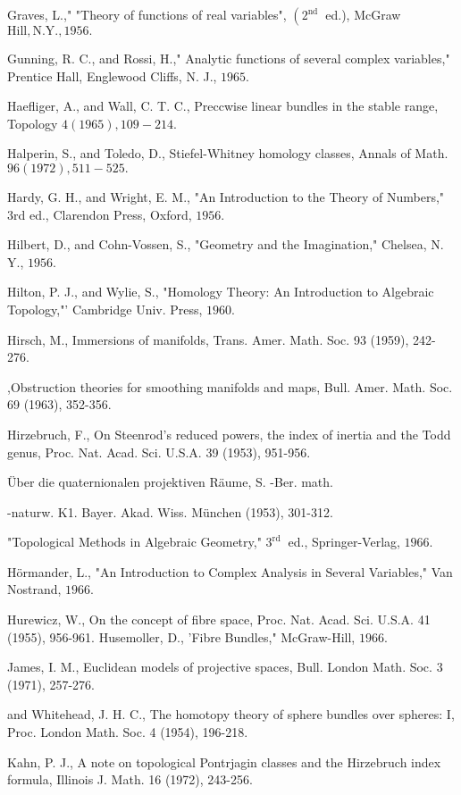\documentclass[10pt]{article}
\begin{document}
Graves, L.," "Theory of functions of real variables", $\left(2^{\text {nd }}\right.$ ed.), McGraw$\mathrm{Hill}, \mathrm{N} . \mathrm{Y} ., 1956 .$

Gunning, R. C., and Rossi, H.," Analytic functions of several complex variables," Prentice Hall, Englewood Cliffs, N. J., $1965 .$

Haefliger, A., and Wall, C. T. C., Preccwise linear bundles in the stable range, Topology $4(1965), 109-214 .$

Halperin, S., and Toledo, D., Stiefel-Whitney homology classes, Annals of Math. $96(1972), 511-525 .$

Hardy, G. H., and Wright, E. M., "An Introduction to the Theory of Numbers," 3rd ed., Clarendon Press, Oxford, $1956 .$

Hilbert, D., and Cohn-Vossen, S., "Geometry and the Imagination," Chelsea, N. Y., $1956 .$

Hilton, P. J., and Wylie, S., "Homology Theory: An Introduction to Algebraic Topology,"' Cambridge Univ. Press, $1960 .$

Hirsch, M., Immersions of manifolds, Trans. Amer. Math. Soc. 93 (1959), 242-276.

,Obstruction theories for smoothing manifolds and maps, Bull. Amer. Math. Soc. 69 (1963), 352-356.

Hirzebruch, F., On Steenrod's reduced powers, the index of inertia and the Todd genus, Proc. Nat. Acad. Sci. U.S.A. 39 (1953), 951-956.

Über die quaternionalen projektiven Räume, S. -Ber. math.

-naturw. K1. Bayer. Akad. Wiss. München (1953), 301-312.

"Topological Methods in Algebraic Geometry," $3^{\text {rd }}$ ed., Springer-Verlag, $1966 .$

Hörmander, L., "An Introduction to Complex Analysis in Several Variables," Van Nostrand, $1966 .$

Hurewicz, W., On the concept of fibre space, Proc. Nat. Acad. Sci. U.S.A. 41 (1955), 956-961. Husemoller, D., 'Fibre Bundles," McGraw-Hill, $1966 .$

James, I. M., Euclidean models of projective spaces, Bull. London Math. Soc. 3 (1971), 257-276.

and Whitehead, J. H. C., The homotopy theory of sphere bundles over spheres: I, Proc. London Math. Soc. 4 (1954), 196-218.

Kahn, P. J., A note on topological Pontrjagin classes and the Hirzebruch index formula, Illinois J. Math. 16 (1972), 243-256.
\end{document}
